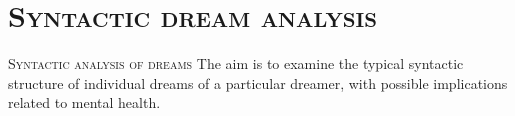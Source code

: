 \documentclass[xcolor=x11names,compress]{beamer}
\begin{document}
\section{\scshape Syntactic dream analysis}
{
\begin{frame}[c]{}
    \centering
    {\scshape \LARGE \color{redUnicam} Syntactic analysis of dreams} \newline \newline
    {The aim is to examine the typical syntactic structure of individual dreams of a particular dreamer,
    with possible implications related to mental health.}
\end{frame}}
\end{document}
